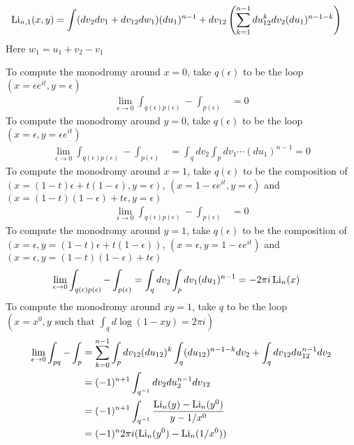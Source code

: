 \documentclass[main]{subfiles}
\begin{document}
\begin{align*}
\operatorname{Li}_{n,1}(x,y)&=\int (dv_2dv_1+dv_{12}dw_1)(du_1)^{n-1} +dv_{12}\left(\sum_{k=1}^{n-1}du_{12}^kdv_2(du_1)^{n-1-k}\right)
\end{align*}
Here $w_{1}=u_1+v_2-v_1$

To compute the monodromy around $x=0$, take $q(\epsilon)$ to be the loop $(x=\epsilon e^{it},y=\epsilon)$
\begin{align*}
\lim_{\epsilon\to0}\int_{q(\epsilon)p(\epsilon)}-\int_{p(\epsilon)}&=0
\end{align*}
To compute the monodromy around $y=0$, take $q(\epsilon)$ to be the loop $(x=\epsilon,y=\epsilon e^{it})$
\begin{align*}
\lim_{\epsilon\to0}\int_{q(\epsilon)p(\epsilon)}-\int_{p(\epsilon)}&=\int_qdv_2\int_pdv_1\cdots(du_1)^{n-1}=0
\end{align*}
To compute the monodromy around $x=1$, take $q(\epsilon)$ to be the composition of $(x=(1-t)\epsilon+t(1-\epsilon),y=\epsilon)$, $(x=1-\epsilon e^{it},y=\epsilon)$ and $(x=(1-t)(1-\epsilon)+t\epsilon,y=\epsilon)$
\begin{align*}
\lim_{\epsilon\to0}\int_{q(\epsilon)p(\epsilon)}-\int_{p(\epsilon)}&=0
\end{align*}
To compute the monodromy around $y=1$, take $q(\epsilon)$ to be the composition of $(x=\epsilon,y=(1-t)\epsilon+t(1-\epsilon))$, $(x=\epsilon,y=1-\epsilon e^{it})$ and $(x=\epsilon,y=(1-t)(1-\epsilon)+t\epsilon)$
\begin{align*}
\lim_{\epsilon\to0}\int_{q(\epsilon)p(\epsilon)}-\int_{p(\epsilon)}&=\int_qdv_2\int_pdv_1(du_1)^{n-1}=-2\pi i\operatorname{Li}_n(x)
\end{align*}
To compute the monodromy around $xy=1$, take $q$ to be the loop $(x=x^0,y\text{ such that }\int_qd\log(1-xy)=2\pi i)$
\begin{align*}
\lim_{\epsilon\to0}\int_{pq}-\int_{p}&=\sum_{k=0}^{n-1}\int_pdv_{12}(du_{12})^k\int_q(du_{12})^{n-1-k}dv_2
+\int_qdv_{12}du_{12}^{n-1}dv_2 \\
&=(-1)^{n+1}\int_{q^{-1}}dv_2du_{2}^{n-1}dv_{12} \\
&=(-1)^{n+1}\int_{q^{-1}}\frac{\operatorname{Li}_n(y)-\operatorname{Li}_n(y^0)}{y-1/x^0} \\
&=(-1)^n2\pi i(\operatorname{Li}_n(y^0)-\operatorname{Li}_n(1/x^0))
\end{align*}
\end{document}
